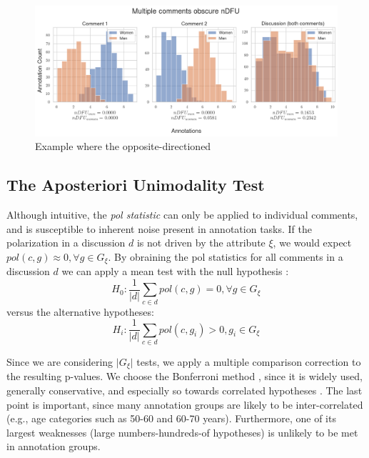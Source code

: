 \documentclass{article}
\begin{document}
\begin{figure}
	\centering
	\includegraphics[width=\linewidth]{ndfu_multi_comments.png}
	\caption{Example where the opposite-directioned }
	\label{fig:ndfu_multi_comment}
\end{figure}



\subsection{The Aposteriori Unimodality Test}
\label{ssec:methodology:aposteriori}

Although intuitive, the \textit{pol statistic} can only be applied to individual comments, and is susceptible to inherent noise present in annotation tasks. If the polarization in a discussion $d$ is not driven by the attribute $\xi$, we would expect $pol(c, g) \approx 0,  \forall g \in G_{\xi}$. By obraining the pol statistics for all comments in a discussion $d$ we can apply a mean test with the null hypothesis :
\begin{equation}
	H_0: \frac{1}{\lvert d \rvert} \sum\limits_{c \in d} pol(c, g) = 0, \forall g \in G_{\xi}
\end{equation}
\noindent versus the alternative hypotheses: 
\begin{equation}
	H_i:  \frac{1}{\lvert d \rvert} \sum\limits_{c \in d}  pol(c, g_i) > 0, g_i \in G_{\xi}
\end{equation}

Since we are considering $\lvert G_{\xi} \rvert$ tests, we apply a multiple comparison correction to the resulting p-values. We choose the Bonferroni method \parencite{Bland170}, since it is widely used, generally conservative, and especially so towards correlated hypotheses \parencite{ChenFengYi2017}. The last point is important, since many annotation groups are likely to be inter-correlated (e.g., age categories such as 50-60 and 60-70 years). Furthermore, one of its largest weaknesses (large numbers-hundreds-of hypotheses) is unlikely to be met in annotation groups.
\end{document}

